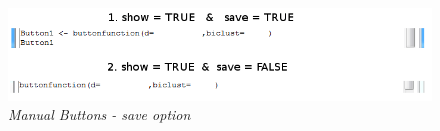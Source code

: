 \documentclass[a4paper]{article}\usepackage[]{graphicx}\usepackage[]{color}
\begin{document}
\begin{figure}[H]
\centering
\includegraphics[scale=0.5]{figures/manualbutton_showsave.png}
\caption{{\it Manual Buttons - save option}
\label{manualbutton_showsave}}
\end{figure}

\end{document}
